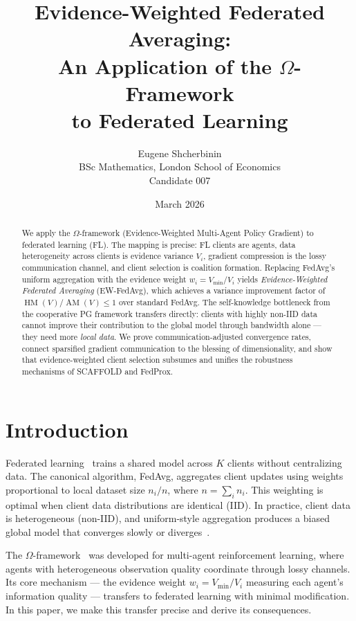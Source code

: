 \documentclass[11pt,a4paper]{article}
\title{Evidence-Weighted Federated Averaging:\\
An Application of the $\Omega$-Framework\\to Federated Learning}
\author{Eugene Shcherbinin\\
\small BSc Mathematics, London School of Economics\\
\small Candidate 007}
\date{March 2026}
\DeclareMathOperator{\AM}{AM}
\DeclareMathOperator{\HM}{HM}
\begin{document}
\maketitle

\begin{abstract}
We apply the $\Omega$-framework (Evidence-Weighted Multi-Agent Policy Gradient)
to federated learning (FL). The mapping is precise: FL clients are agents,
data heterogeneity across clients is evidence variance $V_i$, gradient
compression is the lossy communication channel, and client selection is
coalition formation. Replacing FedAvg's uniform aggregation with the evidence
weight $w_i = V_{\min}/V_i$ yields \emph{Evidence-Weighted Federated Averaging}
(EW-FedAvg), which achieves a variance improvement factor of
$\HM(V)/\AM(V) \leq 1$ over standard FedAvg. The self-knowledge bottleneck
from the cooperative PG framework transfers directly: clients with highly
non-IID data cannot improve their contribution to the global model through
bandwidth alone --- they need more \emph{local data}. We prove communication-adjusted
convergence rates, connect sparsified gradient communication to the blessing
of dimensionality, and show that evidence-weighted client selection subsumes
and unifies the robustness mechanisms of SCAFFOLD and FedProx.
\end{abstract}

\tableofcontents

\section{Introduction}
\label{sec:intro}

Federated learning~\cite{mcmahan2017} trains a shared model across $K$
clients without centralizing data. The canonical algorithm, FedAvg,
aggregates client updates using weights proportional to local dataset size
$n_i / n$, where $n = \sum_i n_i$. This weighting is optimal when client
data distributions are identical (IID). In practice, client data is
heterogeneous (non-IID), and uniform-style aggregation produces a biased
global model that converges slowly or diverges~\cite{karimireddy2020,li2020fedprox}.

The $\Omega$-framework~\cite{ewpg2026} was developed for multi-agent
reinforcement learning, where agents with heterogeneous observation quality
coordinate through lossy channels. Its core mechanism --- the evidence weight
$w_i = V_{\min}/V_i$ measuring each agent's information quality --- transfers
to federated learning with minimal modification. In this paper, we make this
transfer precise and derive its consequences.
\end{document}
